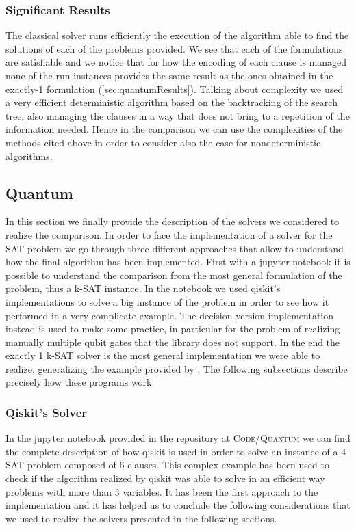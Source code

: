 \documentclass[english]{article}
\begin{document}
			\subsubsection{Significant Results}
			\label{sec:classicResults}
				The classical solver runs efficiently the execution of the algorithm able to find the solutions of each of the problems provided. We see that each of the formulations are satisfiable and we notice that for how the encoding of each clause is managed none of the run instances provides the same result as the ones obtained in the exactly-1 formulation (\ref{sec:quantumResults}). Talking about complexity we used a very efficient deterministic algorithm based on the backtracking of the search tree, also managing the clauses in a way that does not bring to a repetition of the information needed. Hence in the comparison we can use the complexities of the methods cited above in order to consider also the case for nondeterministic algorithms.
				
		\subsection{Quantum}
		\label{sec:satQuantum}
			In this section we finally provide the description of the solvers we considered to realize the comparison. In order to face the implementation of a solver for the SAT problem we go through three different approaches that allow to understand how the final algorithm has been implemented. First with a jupyter notebook it is possible to understand the comparison from the most general formulation of the problem, thus a k-SAT instance. In the notebook we used qiskit's implementations to solve a big instance of the problem in order to see how it performed in a very complicate example. The decision version implementation instead is used to make some practice, in particular for the problem of realizing manually multiple qubit gates that the library does not support. In the end the exactly 1 k-SAT solver is the most general implementation we were able to realize, generalizing the example provided by \cite[Nannicini G.]{introNoPh}. The following subsections describe precisely how these programs work.
		
			\subsubsection{Qiskit's Solver}
			\label{sec:quantumQiskitSolver}
				In the jupyter notebook provided in the repository at \textsc{Code/Quantum} we can find the complete description of how qiskit is used in order to solve an instance of a 4-SAT problem composed of 6 clauses. This complex example has been used to check if the algorithm realized by qiskit was able to solve in an efficient way problems with more than 3 variables. It has been the first approach to the implementation and it has helped us to conclude the following considerations that we used to realize the solvers presented in the following sections. \\
				
\end{document}

